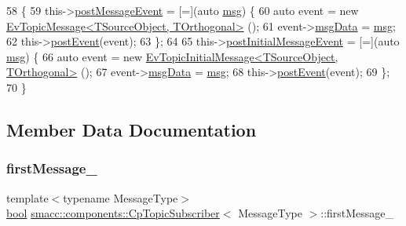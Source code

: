 \begin{DoxyCode}
58     \{
59         this->\hyperlink{classsmacc_1_1components_1_1CpTopicSubscriber_a002ca59f74f784f14597d1c0e057d298}{postMessageEvent} = [=](\textcolor{keyword}{auto} \hyperlink{namespacebattery__monitor__node_ab1920c64448816edd4064e494275fdff}{msg}) \{
60             \textcolor{keyword}{auto} \textcolor{keyword}{event} = \textcolor{keyword}{new} \hyperlink{structsmacc_1_1default__events_1_1EvTopicMessage}{EvTopicMessage<TSourceObject, TOrthogonal>}
      ();
61             \textcolor{keyword}{event}->\hyperlink{structsmacc_1_1default__events_1_1EvTopicMessage_a2e620e5a9227f969e49b2650a27ad055}{msgData} = \hyperlink{namespacebattery__monitor__node_ab1920c64448816edd4064e494275fdff}{msg};
62             this->\hyperlink{classsmacc_1_1ISmaccComponent_a84455564c2c4b90be58e900050232722}{postEvent}(event);
63         \};
64 
65         this->\hyperlink{classsmacc_1_1components_1_1CpTopicSubscriber_a9e1c210ebc8d5ef0c837e8bd9b83f754}{postInitialMessageEvent} = [=](\textcolor{keyword}{auto} \hyperlink{namespacebattery__monitor__node_ab1920c64448816edd4064e494275fdff}{msg}) \{
66             \textcolor{keyword}{auto} \textcolor{keyword}{event} = \textcolor{keyword}{new} \hyperlink{structsmacc_1_1default__events_1_1EvTopicInitialMessage}{EvTopicInitialMessage<TSourceObject, TOrthogonal>}
      ();
67             \textcolor{keyword}{event}->\hyperlink{structsmacc_1_1default__events_1_1EvTopicInitialMessage_a0cc6d194c202e33c3fbc9bf0a3528256}{msgData} = \hyperlink{namespacebattery__monitor__node_ab1920c64448816edd4064e494275fdff}{msg};
68             this->\hyperlink{classsmacc_1_1ISmaccComponent_a84455564c2c4b90be58e900050232722}{postEvent}(event);
69         \};
70     \}
\end{DoxyCode}


\subsection{Member Data Documentation}
\mbox{\label{classsmacc_1_1components_1_1CpTopicSubscriber_aadbaf8c0f0a2a5bea38f41356528f41c}} 
\subsubsection{\texorpdfstring{first\+Message\+\_\+}{firstMessage\_}}
{\footnotesize\ttfamily template$<$typename Message\+Type$>$ \\
\hyperlink{classbool}{bool} \hyperlink{classsmacc_1_1components_1_1CpTopicSubscriber}{smacc\+::components\+::\+Cp\+Topic\+Subscriber}$<$ Message\+Type $>$\+::first\+Message\+\_\+\hspace{0.3cm}{\ttfamily [private]}}



